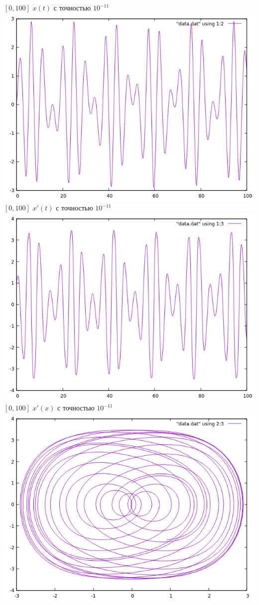 \documentclass[12pt, a4paper] {report}
\theoremstyle{remark}
\theoremstyle{definition}
\begin{document}
$[0,100]$ $x(t)$ с точностью $10^{-11}$\\
\includegraphics[scale=1]{01001201.png}\\
\newpage
$[0,100]$ $x'(t)$ с точностью $10^{-11}$\\
\includegraphics[scale=1]{01001301.png}\\
\newpage
$[0,100]$ $x'(x)$ с точностью $10^{-11}$\\
\includegraphics[scale=1]{01002301.png}\\
\end{document}
